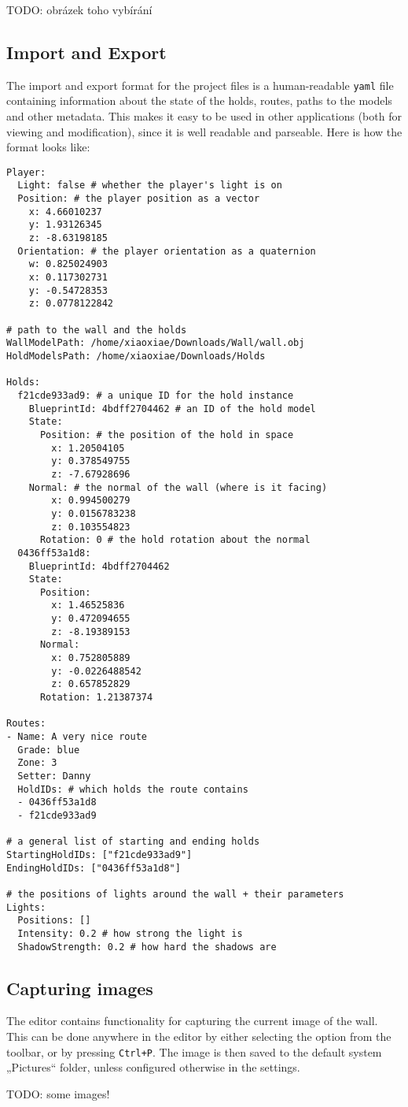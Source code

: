 TODO: obrázek toho vybírání


\subsection{Import and Export}
The import and export format for the project files is a human-readable \verb|yaml| file containing information about the state of the holds, routes, paths to the models and other metadata.
This makes it easy to be used in other applications (both for viewing and modification), since it is well readable and parseable.
Here is how the format looks like:

\begin{verbatim}
Player:
  Light: false # whether the player's light is on
  Position: # the player position as a vector
    x: 4.66010237
    y: 1.93126345
    z: -8.63198185
  Orientation: # the player orientation as a quaternion
    w: 0.825024903
    x: 0.117302731
    y: -0.54728353
    z: 0.0778122842

# path to the wall and the holds
WallModelPath: /home/xiaoxiae/Downloads/Wall/wall.obj
HoldModelsPath: /home/xiaoxiae/Downloads/Holds

Holds:
  f21cde933ad9: # a unique ID for the hold instance
    BlueprintId: 4bdff2704462 # an ID of the hold model
    State:
      Position: # the position of the hold in space
        x: 1.20504105
        y: 0.378549755
        z: -7.67928696
    Normal: # the normal of the wall (where is it facing)
        x: 0.994500279
        y: 0.0156783238
        z: 0.103554823
      Rotation: 0 # the hold rotation about the normal
  0436ff53a1d8:
    BlueprintId: 4bdff2704462
    State:
      Position:
        x: 1.46525836
        y: 0.472094655
        z: -8.19389153
      Normal:
        x: 0.752805889
        y: -0.0226488542
        z: 0.657852829
      Rotation: 1.21387374

Routes:
- Name: A very nice route
  Grade: blue
  Zone: 3
  Setter: Danny
  HoldIDs: # which holds the route contains
  - 0436ff53a1d8
  - f21cde933ad9

# a general list of starting and ending holds
StartingHoldIDs: ["f21cde933ad9"]
EndingHoldIDs: ["0436ff53a1d8"]

# the positions of lights around the wall + their parameters
Lights:
  Positions: []
  Intensity: 0.2 # how strong the light is
  ShadowStrength: 0.2 # how hard the shadows are
\end{verbatim}

\subsection{Capturing images}
The editor contains functionality for capturing the current image of the wall.
This can be done anywhere in the editor by either selecting the option from the toolbar, or by pressing \verb|Ctrl+P|.
The image is then saved to the default system „Pictures“ folder, unless configured otherwise in the settings.

TODO: some images!
